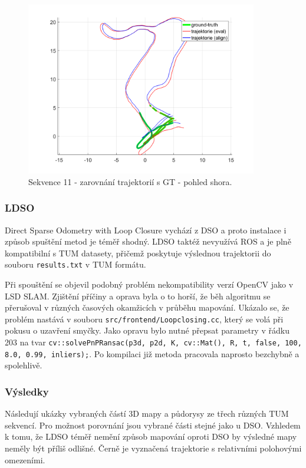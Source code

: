 \documentclass[12pt,a4paper]{article}
\begin{document}
\begin{figure}[H]
\centering
\includegraphics[width=0.9\textwidth]{img/m_dso_11_2.png}
\caption{Sekvence 11 - zarovnání trajektorií s GT - pohled shora.}
\end{figure}


\subsubsection{LDSO}
Direct Sparse Odometry with Loop Closure vychází z DSO a proto instalace i způsob spuštění metod je téměř shodný. LDSO taktéž nevyužívá ROS a je plně kompatibilní s TUM datasety, přičemž poskytuje výslednou trajektorii do souboru \texttt{results.txt} v TUM formátu.

Při spouštění se objevil podobný problém nekompatibility verzí OpenCV jako v LSD SLAM. Zjištění příčiny a oprava byla o to horší, že běh algoritmu se přerušoval v různých časových okamžicích v průběhu mapování. Ukázalo se, že problém nastává v souboru \texttt{src/frontend/Loopclosing.cc}, který se volá při pokusu o uzavření smyčky. Jako opravu bylo nutné přepsat parametry v řádku 203 na tvar \texttt{cv::solvePnPRansac(p3d, p2d, K, cv::Mat(), R, t, false, 100, 8.0, 0.99, inliers);}. Po kompilaci již metoda pracovala naprosto bezchybně a spolehlivě.

\subsubsection*{Výsledky}
Následují ukázky vybraných částí 3D mapy a půdorysy ze třech různých TUM sekvencí. Pro možnost porovnání jsou vybrané části stejné jako u DSO. Vzhledem k tomu, že LDSO téměř nemění způsob mapování oproti DSO by výsledné mapy neměly být příliš odlišné. Černě je vyznačená trajektorie s relativními polohovými omezeními.
\end{document}
